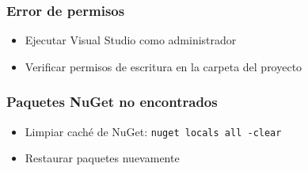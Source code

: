 \documentclass[12pt]{article}
\begin{document}
\subsubsection*{Error de permisos}
\begin{itemize}
    \item Ejecutar Visual Studio como administrador
    \item Verificar permisos de escritura en la carpeta del proyecto
\end{itemize}

\subsubsection*{Paquetes NuGet no encontrados}
\begin{itemize}
    \item Limpiar caché de NuGet: \texttt{nuget locals all -clear}
    \item Restaurar paquetes nuevamente
\end{itemize}
\end{document}
